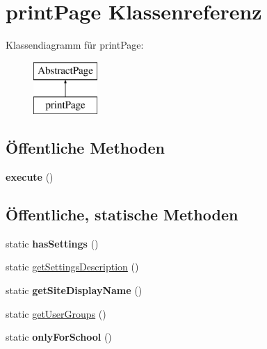 \hypertarget{classprint_page}{}\section{print\+Page Klassenreferenz}
\label{classprint_page}
Klassendiagramm für print\+Page\+:\begin{figure}[H]
\begin{center}
\leavevmode
\includegraphics[height=2.000000cm]{classprint_page}
\end{center}
\end{figure}
\subsection*{Öffentliche Methoden}
\begin{DoxyCompactItemize}
\item 
\mbox{\label{classprint_page_a4fca33c34c63e036e4113167ae80bdcb}} 
{\bfseries execute} ()
\end{DoxyCompactItemize}
\subsection*{Öffentliche, statische Methoden}
\begin{DoxyCompactItemize}
\item 
\mbox{\label{classprint_page_ac6b1276f0df87ba7714f91f96dce3338}} 
static {\bfseries has\+Settings} ()
\item 
static \mbox{\hyperlink{classprint_page_a26953bccc34e77bcfe16cd2c7d7b53d4}{get\+Settings\+Description}} ()
\item 
\mbox{\label{classprint_page_ab74562013f13b46dfa2ef52ecf8e768f}} 
static {\bfseries get\+Site\+Display\+Name} ()
\item 
static \mbox{\hyperlink{classprint_page_a7a84a19cc837708cf19996b58b86136f}{get\+User\+Groups}} ()
\item 
\mbox{\label{classprint_page_a9a15848c121b856b4d0d87d1888e28f0}} 
static {\bfseries only\+For\+School} ()
\end{DoxyCompactItemize}
